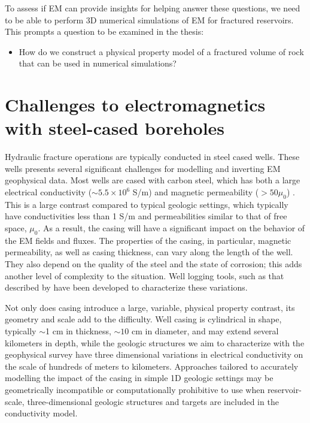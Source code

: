 To assess if EM can provide insights for helping answer these questions, we need to be able to perform 3D numerical simulations of EM for fractured reservoirs. This prompts a question to be examined in the thesis:
\begin{itemize}
\item{How do we construct a physical property model of a fractured volume of rock that can be used in numerical simulations?}
\end{itemize}

\section{Challenges to electromagnetics with steel-cased boreholes}
\label{sec:challenges-steel-casing}

Hydraulic fracture operations are typically conducted in steel cased wells. These wells presents several significant challenges for modelling and inverting EM geophysical data. Most wells are cased with carbon steel, which has both a large electrical conductivity ($\sim 5.5\times 10^6$ S/m) and magnetic permeability ($> 50 \mu_0$) \citep{wuhabashy1994}. This is a large contrast compared to  typical geologic settings, which typically have conductivities less than 1 S/m and permeabilities similar to that of free space, $\mu_0$. As a result, the casing will have a significant impact on the behavior of the EM fields and fluxes. The properties of the casing, in particular, magnetic permeability, as well as casing thickness, can vary along the length of the well. They also  depend on the quality of the steel and the state of corrosion; this adds another level of complexity to the situation. Well logging tools, such as that described by \cite{brill2012} have been developed to characterize these variations.

Not only does casing introduce a large, variable, physical property contrast, its geometry and scale add to the difficulty. Well casing is cylindrical in shape, typically $\sim$1 cm in thickness, $\sim10$ cm in diameter, and may extend several kilometers in depth, while the geologic structures we aim to characterize with the geophysical survey have three dimensional variations in electrical conductivity on the scale of hundreds of meters to kilometers. Approaches tailored to accurately modelling the impact of the casing in simple 1D geologic settings may be geometrically incompatible or computationally prohibitive to use when reservoir-scale, three-dimensional geologic structures and targets are included in the conductivity model.

